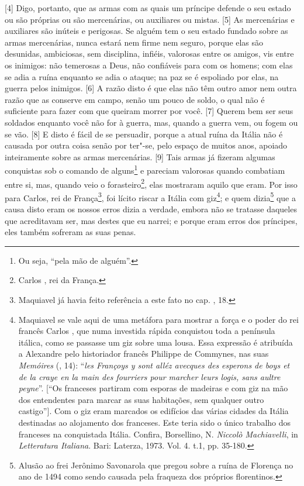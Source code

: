 {[}4{]} Digo, portanto, que as armas com as quais um príncipe defende o
seu estado ou são próprias ou são mercenárias, ou auxiliares ou mistas.
{[}5{]} As mercenárias e auxiliares são inúteis e perigosas. Se alguém
tem o seu estado fundado sobre as armas mercenárias, nunca estará nem
firme nem seguro, porque elas são desunidas, ambiciosas, sem disciplina,
infiéis, valorosas entre os amigos, vis entre os inimigos: não temerosas
a Deus, não confiáveis para com os homens; com elas se adia a ruína
enquanto se adia o ataque; na paz se é espoliado por elas, na guerra
pelos inimigos. {[}6{]} A razão disto é que elas não têm outro amor nem
outra razão que as conserve em campo, senão um pouco de soldo, o qual
não é suficiente para fazer com que queiram morrer por você. {[}7{]}
Querem bem ser seus soldados enquanto você não for à guerra, mas, quando
a guerra vem, ou fogem ou se vão. {[}8{]} E disto é fácil de se
persuadir, porque a atual ruína da Itália não é causada por outra coisa
senão por ter"-se, pelo espaço de muitos anos, apoiado inteiramente sobre
as armas mercenárias. {[}9{]} Tais armas já fizeram algumas conquistas
sob o comando de alguns\footnote{Ou seja, ``pela mão de alguém''.} e
pareciam valorosas quando combatiam entre si, mas, quando veio o
forasteiro\footnote{Carlos , rei da França.}, elas mostraram aquilo que
eram. Por isso para Carlos, rei de França\footnote{Maquiavel já havia
  feito referência a este fato no cap. , 18.}, foi lícito riscar a
Itália com giz\footnote{Maquiavel se vale aqui de uma metáfora para
  mostrar a força e o poder do rei francês Carlos , que numa investida
  rápida conquistou toda a península itálica, como se passasse um giz
  sobre uma lousa. Essa expressão é atribuída a Alexandre  pelo
  historiador francês Philippe de Commynes, nas suas \emph{Memóires}
  (, 14): ``\emph{les Françoys y sont alléz avecques des esperons de
  boys et de la craye en la main des fourriers pour marcher leurs logis,
  sans aultre peyne}''. {[}``Os franceses partiram com esporas de
  madeiras e com giz na mão dos entendentes para marcar as suas
  habitações, sem qualquer outro castigo''{]}. Com o giz eram marcados
  os edifícios das várias cidades da Itália destinadas ao alojamento dos
  franceses. Este teria sido o único trabalho dos franceses na
  conquistada Itália. Confira, Borsellino, N. \emph{Niccolò
  Machiavelli}, in \emph{Letteratura Italiana}. Bari: Laterza, 1973.
  Vol. 4. t.1, pp. 35-180.}; e quem dizia\footnote{Alusão ao frei
  Jerônimo Savonarola que pregou sobre a ruína de Florença no ano de
  1494 como sendo causada pela fraqueza dos próprios florentinos.} que a
causa disto eram os nossos erros dizia a verdade, embora não se tratasse
daqueles que acreditavam ser, mas destes que eu narrei; e porque eram
erros dos príncipes, eles também sofreram as suas penas.

